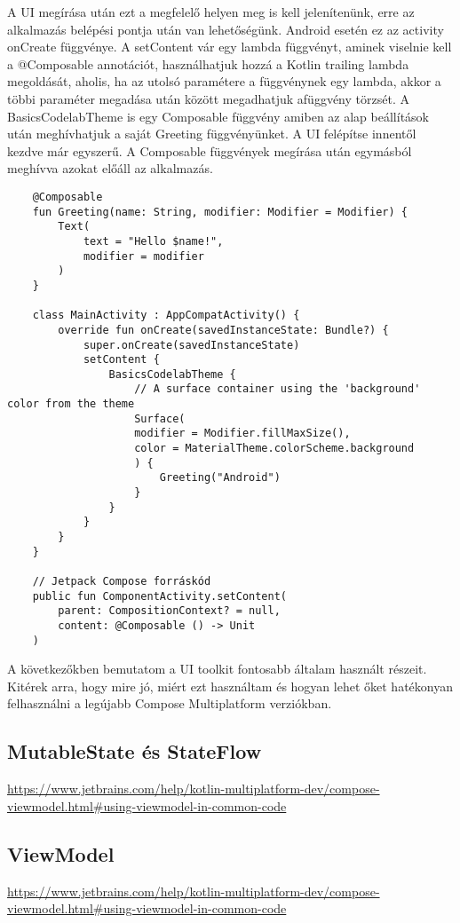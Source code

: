 A UI megírása után ezt a megfelelő helyen meg is kell jelenítenünk, erre az alkalmazás belépési pontja után van lehetőségünk.
Android esetén ez az activity onCreate függvénye.
A setContent vár egy lambda függvényt, aminek viselnie kell a @Composable annotációt, használhatjuk hozzá a Kotlin trailing lambda megoldását, aholis, ha az utolsó paramétere a függvénynek egy lambda, akkor a többi paraméter megadása után {} között megadhatjuk afüggvény törzsét.
A BasicsCodelabTheme is egy Composable függvény amiben az alap beállítások után meghívhatjuk a saját Greeting függvényünket.
A UI felépítse innentől kezdve már egyszerű.
A Composable függvények megírása után egymásból meghívva azokat előáll az alkalmazás.

\begin{lstlisting}
    @Composable
    fun Greeting(name: String, modifier: Modifier = Modifier) {
        Text(
            text = "Hello $name!",
            modifier = modifier
        )
    }

    class MainActivity : AppCompatActivity() {
        override fun onCreate(savedInstanceState: Bundle?) {
            super.onCreate(savedInstanceState)
            setContent {
                BasicsCodelabTheme {
                    // A surface container using the 'background' color from the theme
                    Surface(
                    modifier = Modifier.fillMaxSize(),
                    color = MaterialTheme.colorScheme.background
                    ) {
                        Greeting("Android")
                    }
                }
            }
        }
    }

    // Jetpack Compose forráskód
    public fun ComponentActivity.setContent(
        parent: CompositionContext? = null,
        content: @Composable () -> Unit
    )
\end{lstlisting}

A következőkben bemutatom a UI toolkit fontosabb általam használt részeit.
Kitérek arra, hogy mire jó, miért ezt használtam és hogyan lehet őket hatékonyan felhasználni a legújabb Compose Multiplatform verziókban.

\subsection{MutableState és StateFlow}
\url{https://www.jetbrains.com/help/kotlin-multiplatform-dev/compose-viewmodel.html#using-viewmodel-in-common-code} 

\subsection{ViewModel}
\url{https://www.jetbrains.com/help/kotlin-multiplatform-dev/compose-viewmodel.html#using-viewmodel-in-common-code}

